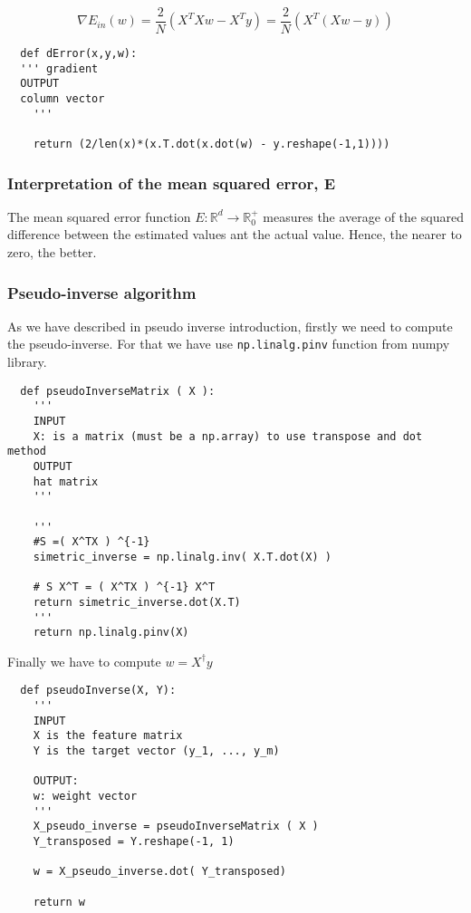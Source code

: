   $$\nabla E_{in}(w) = \frac{2}{N}(X^TXw - X^T y)= \frac{2}{N}(X^T(Xw -  y))$$
  
\begin{verbatim}
  def dError(x,y,w):
  ''' gradient
  OUTPUT
  column vector
    '''

    return (2/len(x)*(x.T.dot(x.dot(w) - y.reshape(-1,1))))
  \end{verbatim}

  \subsubsection{Interpretation of the mean squared error, E}
  The mean squared error function $E: \mathbb R ^d \longrightarrow \mathbb R^+_0$ measures the average of the squared difference between the estimated values ant the actual value\cite{MSE}. Hence, the nearer to zero, the better.

  
  

\subsubsection{Pseudo-inverse algorithm}

As we have described in pseudo inverse introduction, firstly we need to compute the pseudo-inverse. For that we have use  \texttt{np.linalg.pinv} \cite{pseudo-inverse}function from numpy library.

\begin{verbatim}
  def pseudoInverseMatrix ( X ):
    '''
    INPUT 
    X: is a matrix (must be a np.array) to use transpose and dot method
    OUTPUT
    hat matrix 
    '''

    '''
    #S =( X^TX ) ^{-1}
    simetric_inverse = np.linalg.inv( X.T.dot(X) )

    # S X^T = ( X^TX ) ^{-1} X^T
    return simetric_inverse.dot(X.T)
    '''
    return np.linalg.pinv(X)
\end{verbatim}

Finally we have to compute $w = X^\dagger y$


\begin{verbatim}
  def pseudoInverse(X, Y):
    ''' 
    INPUT
    X is the feature matrix 
    Y is the target vector (y_1, ..., y_m)
    
    OUTPUT: 
    w: weight vector
    '''
    X_pseudo_inverse = pseudoInverseMatrix ( X )
    Y_transposed = Y.reshape(-1, 1)
    
    w = X_pseudo_inverse.dot( Y_transposed)
    
    return w

  \end{verbatim}

